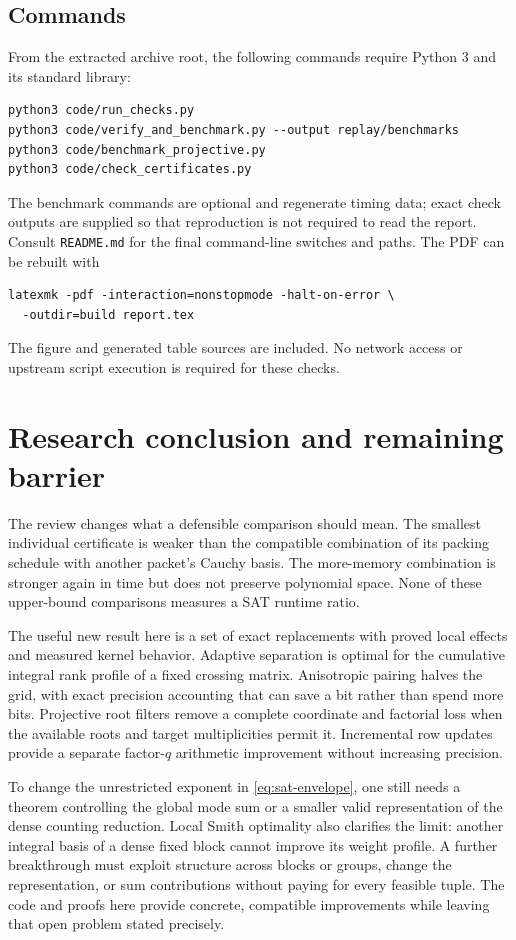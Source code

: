 \documentclass[11pt,letterpaper]{article}
\theoremstyle{definition}\newtheorem{definition}[theorem]{Definition}
\theoremstyle{remark}\newtheorem{remark}[theorem]{Remark}
\begin{document}
\subsection{Commands}
From the extracted archive root, the following commands require Python 3
and its standard library:
\begin{verbatim}
python3 code/run_checks.py
python3 code/verify_and_benchmark.py --output replay/benchmarks
python3 code/benchmark_projective.py
python3 code/check_certificates.py
\end{verbatim}
The benchmark commands are optional and regenerate timing data; exact
check outputs are supplied so that reproduction is not required to read
the report. Consult \texttt{README.md} for the final command-line switches
and paths. The PDF can be rebuilt with
\begin{verbatim}
latexmk -pdf -interaction=nonstopmode -halt-on-error \
  -outdir=build report.tex
\end{verbatim}
The figure and generated table sources are included. No network access or
upstream script execution is required for these checks.

\section{Research conclusion and remaining barrier}
The review changes what a defensible comparison should mean. The smallest
individual certificate is weaker than the compatible combination of its
packing schedule with another packet's Cauchy basis. The more-memory
combination is stronger again in time but does not preserve polynomial
space. None of these upper-bound comparisons measures a SAT runtime ratio.

The useful new result here is a set of exact replacements with proved
local effects and measured kernel behavior. Adaptive separation is optimal
for the cumulative integral rank profile of a fixed crossing matrix.
Anisotropic pairing halves the grid, with exact precision accounting that
can save a bit rather than spend more bits. Projective root filters remove
a complete coordinate and factorial loss when the available roots and
target multiplicities permit it. Incremental row updates provide a
separate factor-$q$ arithmetic improvement without increasing precision.

To change the unrestricted exponent in \eqref{eq:sat-envelope}, one still
needs a theorem controlling the global mode sum or a smaller valid
representation of the dense counting reduction. Local Smith optimality
also clarifies the limit: another integral basis of a dense fixed block
cannot improve its weight profile. A further breakthrough must exploit
structure across blocks or groups, change the representation, or sum
contributions without paying for every feasible tuple. The code and proofs
here provide concrete, compatible improvements while leaving that open
problem stated precisely.
\end{document}

